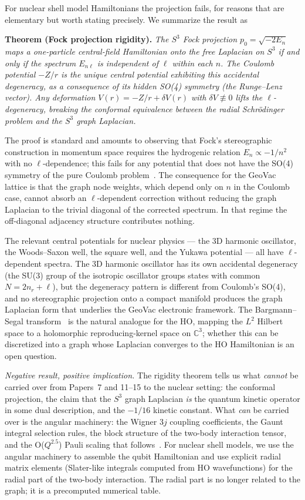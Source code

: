 \documentclass[twocolumn,prc,amsmath,amssymb,superscriptaddress]{revtex4-2}
\begin{document}
For nuclear shell model Hamiltonians the projection fails, for reasons
that are elementary but worth stating precisely. We summarize the
result as

\textbf{Theorem (Fock projection rigidity).}
\emph{The $S^3$ Fock projection $p_0 = \sqrt{-2 E_n}$ maps a one-particle
central-field Hamiltonian onto the free Laplacian on $S^3$ if and only
if the spectrum $E_{n\ell}$ is independent of $\ell$ within each $n$.
The Coulomb potential $-Z/r$ is the unique central potential exhibiting
this accidental degeneracy, as a consequence of its hidden SO(4)
symmetry (the Runge--Lenz vector). Any deformation
$V(r) = -Z/r + \delta V(r)$ with $\delta V \not\equiv 0$ lifts the
$\ell$-degeneracy, breaking the conformal equivalence between the
radial Schr\"odinger problem and the $S^3$ graph Laplacian.}

The proof is standard and amounts to observing that Fock's
stereographic construction in momentum space requires the hydrogenic
relation $E_n \propto -1/n^2$ with no $\ell$-dependence; this fails for
any potential that does not have the SO(4) symmetry of the pure Coulomb
problem~\cite{Bander1966}. The consequence for the GeoVac lattice is
that the graph node weights, which depend only on $n$ in the Coulomb
case, cannot absorb an $\ell$-dependent correction without reducing the
graph Laplacian to the trivial diagonal of the corrected spectrum. In
that regime the off-diagonal adjacency structure contributes nothing.

The relevant central potentials for nuclear physics --- the 3D
harmonic oscillator, the Woods--Saxon well, the square well, and the
Yukawa potential --- all have $\ell$-dependent spectra. The 3D harmonic
oscillator has its own accidental degeneracy (the SU(3) group of the
isotropic oscillator groups states with common $N = 2n_r + \ell$),
but the degeneracy pattern is different from Coulomb's SO(4), and no
stereographic projection onto a compact manifold produces the graph
Laplacian form that underlies the GeoVac electronic framework. The
Bargmann--Segal transform~\cite{Bargmann1961} is the natural analogue
for the HO, mapping the $L^2$ Hilbert space to a holomorphic
reproducing-kernel space on $\mathbb{C}^3$; whether this can be
discretized into a graph whose Laplacian converges to the HO
Hamiltonian is an open question.

\emph{Negative result, positive implication.} The rigidity theorem
tells us what \emph{cannot} be carried over from Papers~7 and 11--15
to the nuclear setting: the conformal projection, the claim that
the $S^3$ graph Laplacian \emph{is} the quantum kinetic operator in
some dual description, and the $-1/16$ kinetic constant. What
\emph{can} be carried over is the angular machinery: the Wigner $3j$
coupling coefficients, the Gaunt integral selection rules, the block
structure of the two-body interaction tensor, and the O($Q^{2.5}$)
Pauli scaling that follows~\cite{Paper22}. For nuclear shell models,
we use the angular machinery to assemble the qubit Hamiltonian and use
explicit radial matrix elements (Slater-like integrals computed from
HO wavefunctions) for the radial part of the two-body interaction. The
radial part is no longer related to the graph; it is a precomputed
numerical table.
\end{document}
